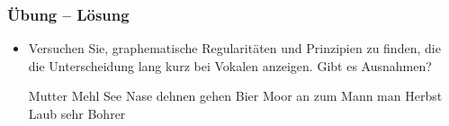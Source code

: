 
\begin{frame}
\frametitle{Übung -- Lösung}

\begin{itemize}	
	\item Versuchen Sie, graphematische Regularitäten und Prinzipien zu finden, die die Unterscheidung lang \vs kurz bei Vokalen anzeigen. Gibt es Ausnahmen?
	
	\ea\label{ex:mutter}
	
	\begin{multicols}{2}
		\ea Mutter
		\ex Mehl
		\ex See
		\ex Nase
		\ex dehnen
		\ex gehen
		\ex Bier
		\ex Moor
		\ex an
		\ex zum
		\ex Mann
		\ex man
		\ex Herbst
		\ex Laub
		\ex sehr
		\ex Bohrer
		\z
	\end{multicols}
	
	\z
	
	
	
\end{itemize}

\end{frame}

